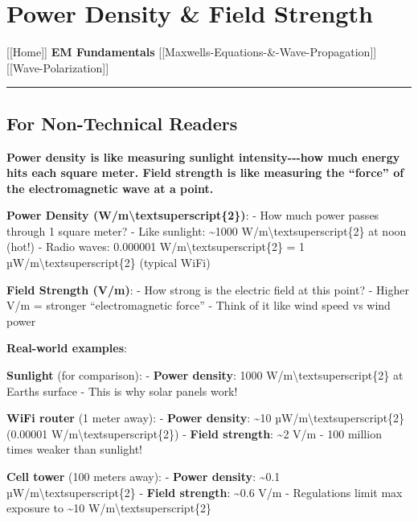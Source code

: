 \section{Power Density \& Field
Strength}\label{power-density-field-strength}

{[}{[}Home{]}{]} \textbar{} \textbf{EM Fundamentals} \textbar{}
{[}{[}Maxwell\textquotesingle s-Equations-\&-Wave-Propagation{]}{]}
\textbar{} {[}{[}Wave-Polarization{]}{]}

\begin{center}\rule{0.5\linewidth}{0.5pt}\end{center}

\subsection{\texorpdfstring{ For Non-Technical
Readers}{ For Non-Technical Readers}}\label{for-non-technical-readers}

\textbf{Power density is like measuring sunlight intensity-\/-\/-how
much energy hits each square meter. Field strength is like measuring the
``force'' of the electromagnetic wave at a point.}

\textbf{Power Density (W/m\textbackslash textsuperscript\{2\})}: - How
much power passes through 1 square meter? - Like sunlight:
\textasciitilde1000 W/m\textbackslash textsuperscript\{2\} at noon
(hot!) - Radio waves: 0.000001 W/m\textbackslash textsuperscript\{2\} =
1 µW/m\textbackslash textsuperscript\{2\} (typical WiFi)

\textbf{Field Strength (V/m)}: - How strong is the electric field at
this point? - Higher V/m = stronger ``electromagnetic force'' - Think of
it like wind speed vs wind power

\textbf{Real-world examples}:

\textbf{Sunlight} (for comparison): - \textbf{Power density}: 1000
W/m\textbackslash textsuperscript\{2\} at Earth\textquotesingle s
surface - This is why solar panels work!

\textbf{WiFi router} (1 meter away): - \textbf{Power density}:
\textasciitilde10 µW/m\textbackslash textsuperscript\{2\} (0.00001
W/m\textbackslash textsuperscript\{2\}) - \textbf{Field strength}:
\textasciitilde2 V/m - 100 million times weaker than sunlight!

\textbf{Cell tower} (100 meters away): - \textbf{Power density}:
\textasciitilde0.1 µW/m\textbackslash textsuperscript\{2\} -
\textbf{Field strength}: \textasciitilde0.6 V/m - Regulations limit max
exposure to \textasciitilde10 W/m\textbackslash textsuperscript\{2\}

